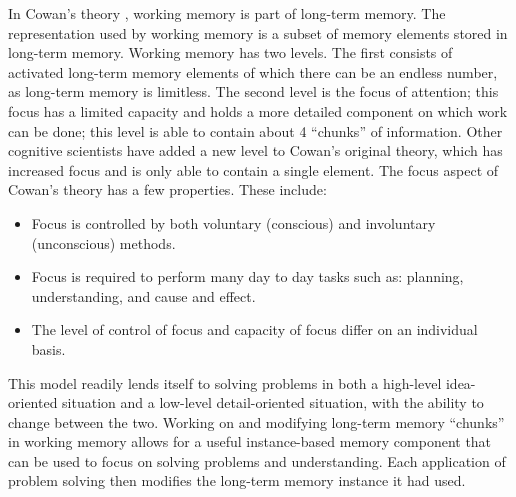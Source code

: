 In Cowan's theory \cite{ACTIVATION, ATTN_MEM}, working memory is part of long-term memory.  The representation used by working memory is a subset of memory elements stored in long-term memory.  Working memory has two levels. The first consists of activated long-term memory elements of which there can be an endless number, as long-term memory is limitless.  The second level is the focus of attention; this focus has a limited capacity and holds a more detailed component on which work can be done; this level is able to contain about 4 ``chunks'' of information.  Other cognitive scientists have added a new level to Cowan's original theory, which has increased focus and is only able to contain a single element. The focus aspect of Cowan's theory has a few properties. These include: 
\begin{itemize}
	\item Focus is controlled by both voluntary (conscious) and involuntary (unconscious) methods. 
	\item Focus is required to perform many day to day tasks such as: planning, understanding, and cause and effect.
	\item The level of control of focus and capacity of focus differ on an individual basis. 
\end{itemize}
   This model readily lends itself to solving problems in both a high-level idea-oriented situation and a low-level detail-oriented situation, with the ability to change between the two.  Working on and modifying long-term memory ``chunks'' in working memory allows for a useful instance-based memory component that can be used to focus on solving problems and understanding.  Each application of problem solving then modifies the long-term memory instance it had used.

